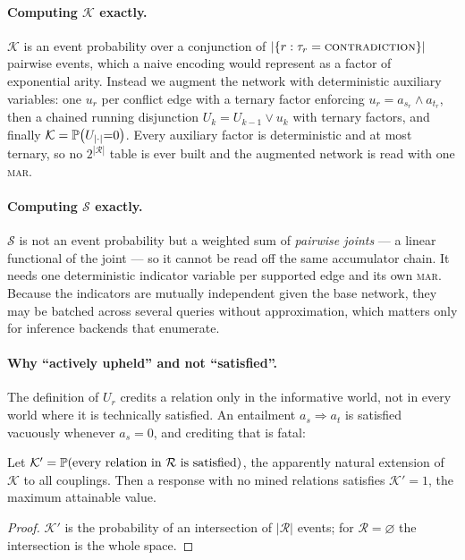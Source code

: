 \paragraph{Computing $\mathcal{K}$ exactly.} $\mathcal{K}$ is an event probability over a conjunction
of $|\{r:\tau_r=\textsc{contradiction}\}|$ pairwise events, which a naive encoding would represent as a factor of
exponential arity. Instead we augment the network with deterministic auxiliary variables: one
$u_r$ per conflict edge with a ternary factor enforcing $u_r = a_{s_r}\wedge a_{t_r}$, then a chained
running disjunction $U_k = U_{k-1}\vee u_k$ with ternary factors, and finally
$\mathcal{K}=\mathbb{P}\!\left( U_{|\cdot|}{=}0 \right)$. Every auxiliary factor is deterministic and at most ternary, so
no $2^{|\mathcal{R}|}$ table is ever built and the augmented network is read with one \textsc{mar}.

\paragraph{Computing $\mathcal{S}$ exactly.} $\mathcal{S}$ is not an event probability but a weighted
sum of \emph{pairwise joints} --- a linear functional of the joint --- so it cannot be read off the
same accumulator chain. It needs one deterministic indicator variable per supported edge and its own
\textsc{mar}. Because the indicators are mutually independent given the base network, they may be
batched across several queries without approximation, which matters only for inference backends that
enumerate.

\paragraph{Why ``actively upheld'' and not ``satisfied''.} The definition of $U_r$ credits a relation
only in the informative world, not in every world where it is technically satisfied. An entailment
$a_s\Rightarrow a_t$ is satisfied vacuously whenever $a_s=0$, and crediting that is fatal:

\begin{proposition}
\label{prop-vacuous}
Let $\mathcal{K}'=\mathbb{P}\!\left( \text{every relation in }\mathcal{R}\text{ is satisfied} \right)$, the apparently
natural extension of $\mathcal{K}$ to all couplings. Then a response with no mined relations
satisfies $\mathcal{K}'=1$, the maximum attainable value.
\end{proposition}

\begin{proof}
$\mathcal{K}'$ is the probability of an intersection of $|\mathcal{R}|$ events; for
$\mathcal{R}=\varnothing$ the intersection is the whole space.
\end{proof}

